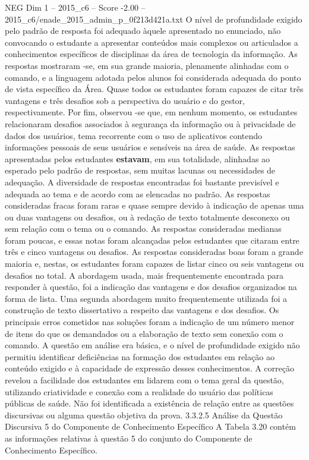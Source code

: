 \begin{textsample}{NEG Dim 1 – 2015\_c6 – Score -2.00 – 2015\_c6/enade\_2015\_admin\_p\_0f213d421a.txt}
O nível de profundidade exigido pelo padrão de resposta foi adequado àquele apresentado no enunciado, não convocando o estudante a apresentar conteúdos mais complexos ou articulados a conhecimentos específicos de disciplinas da área de tecnologia da informação.
As respostas mostraram -se, em sua grande maioria, plenamente alinhadas com o comando, e a linguagem adotada pelos alunos foi considerada adequada do ponto de vista específico da Área.
Quase todos os estudantes foram capazes de citar três vantagens e três desafios sob a perspectiva do usuário e do gestor, respectivamente.
Por fim, observou -se que, em nenhum momento, os estudantes relacionaram desafios associados à segurança da informação ou à privacidade de dados dos usuários, tema recorrente com o uso de aplicativos contendo informações pessoais de seus usuários e sensíveis na área de saúde.
As respostas apresentadas pelos estudantes \textbf{estavam}, em sua totalidade, alinhadas ao esperado pelo padrão de respostas, sem muitas lacunas ou necessidades de adequação.
A diversidade de respostas encontradas foi bastante previsível e adequada ao tema e de acordo com as elencadas no padrão.
As respostas consideradas fracas foram raras e quase sempre devido à indicação de apenas uma ou duas vantagens ou desafios, ou à redação de texto totalmente desconexo ou sem relação com o tema ou o comando.
As respostas consideradas medianas foram poucas, e essas notas foram alcançadas pelos estudantes que citaram entre três e cinco vantagens ou desafios.
As respostas consideradas boas foram a grande maioria e, nestas, os estudantes foram capazes de listar cinco ou seis vantagens ou desafios no total.
A abordagem usada, mais frequentemente encontrada para responder à questão, foi a indicação das vantagens e dos desafios organizados na forma de lista.
Uma segunda abordagem muito frequentemente utilizada foi a construção de texto dissertativo a respeito das vantagens e dos desafios.
Os principais erros cometidos nas soluções foram a indicação de um número menor de itens do que os demandados ou a elaboração de texto sem conexão com o comando.
A questão em análise era básica, e o nível de profundidade exigido não permitiu identificar deficiências na formação dos estudantes em relação ao conteúdo exigido e à capacidade de expressão desses conhecimentos.
A correção revelou a facilidade dos estudantes em lidarem com o tema geral da questão, utilizando criatividade e conexão com a realidade do usuário das políticas públicas de saúde.
Não foi identificada a existência de relação entre as questões discursivas ou alguma questão objetiva da prova. 3.3.2.5 Análise da Questão Discursiva 5 do Componente de Conhecimento Específico A Tabela 3.20 contém as informações relativas à questão 5 do conjunto do Componente de Conhecimento Específico.

\end{textsample}
